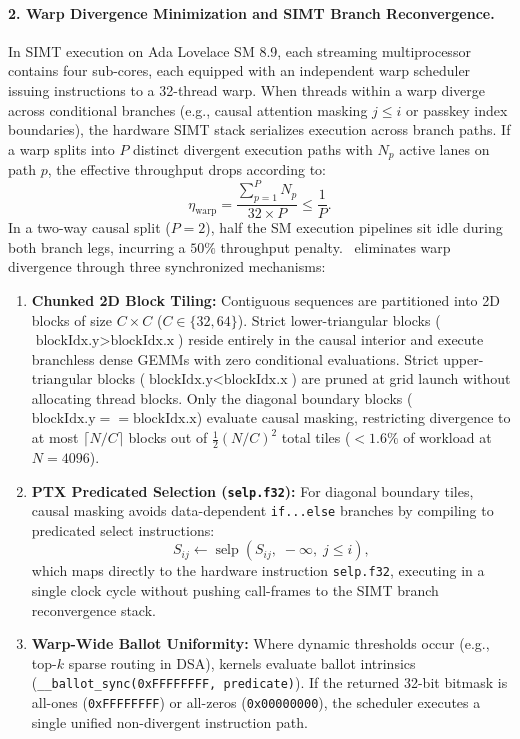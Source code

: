 \paragraph{2. Warp Divergence Minimization and SIMT Branch Reconvergence.}
In SIMT execution on Ada Lovelace SM 8.9, each streaming multiprocessor contains four sub-cores, each equipped with an independent warp scheduler issuing instructions to a 32-thread warp. When threads within a warp diverge across conditional branches (e.g., causal attention masking $j \le i$ or passkey index boundaries), the hardware SIMT stack serializes execution across branch paths. If a warp splits into $P$ distinct divergent execution paths with $N_p$ active lanes on path $p$, the effective throughput drops according to:
\begin{equation}
\label{eq:warp_divergence_efficiency}
\eta_{\text{warp}} = \frac{\sum_{p=1}^P N_p}{32 \times P} \le \frac{1}{P}.
\end{equation}
In a two-way causal split ($P=2$), half the SM execution pipelines sit idle during both branch legs, incurring a $50\%$ throughput penalty. \neuralops\ eliminates warp divergence through three synchronized mechanisms:
\begin{enumerate}
    \item \textbf{Chunked 2D Block Tiling:} Contiguous sequences are partitioned into 2D blocks of size $C \times C$ ($C \in \{32, 64\}$). Strict lower-triangular blocks ($\text{blockIdx.y} > \text{blockIdx.x}$) reside entirely in the causal interior and execute branchless dense GEMMs with zero conditional evaluations. Strict upper-triangular blocks ($\text{blockIdx.y} < \text{blockIdx.x}$) are pruned at grid launch without allocating thread blocks. Only the diagonal boundary blocks ($\text{blockIdx.y} == \text{blockIdx.x}$) evaluate causal masking, restricting divergence to at most $\lceil N / C \rceil$ blocks out of $\frac{1}{2} (N/C)^2$ total tiles ($< 1.6\%$ of workload at $N=4096$).
    \item \textbf{PTX Predicated Selection (\texttt{selp.f32}):} For diagonal boundary tiles, causal masking avoids data-dependent \texttt{if...else} branches by compiling to predicated select instructions:
    \begin{equation}
    \label{eq:predicated_selp}
    S_{ij} \leftarrow \operatorname{selp}\left( S_{ij}, \; -\infty, \; j \le i \right),
    \end{equation}
    which maps directly to the hardware instruction \texttt{selp.f32}, executing in a single clock cycle without pushing call-frames to the SIMT branch reconvergence stack.
    \item \textbf{Warp-Wide Ballot Uniformity:} Where dynamic thresholds occur (e.g., top-$k$ sparse routing in DSA), kernels evaluate ballot intrinsics (\texttt{\_\_ballot\_sync(0xFFFFFFFF, predicate)}). If the returned 32-bit bitmask is all-ones (\texttt{0xFFFFFFFF}) or all-zeros (\texttt{0x00000000}), the scheduler executes a single unified non-divergent instruction path.
\end{enumerate}

